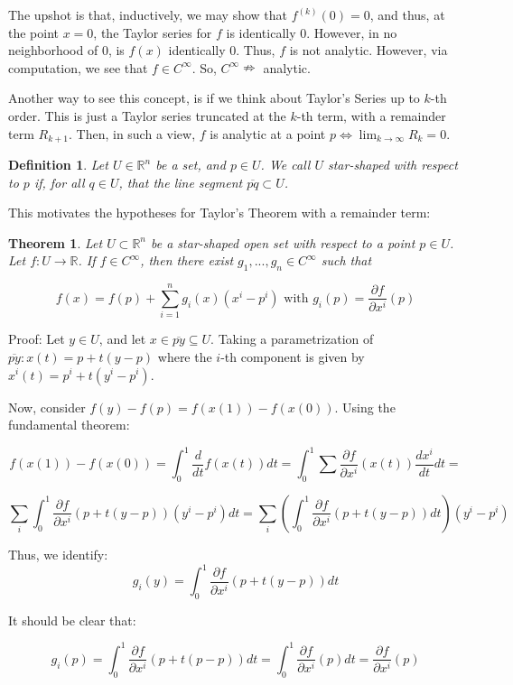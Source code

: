 \documentclass[10pt]{article}
\newtheorem{definition}{Definition}[section]
\newtheorem{theorem}{Theorem}[section]
\begin{document}
The upshot is that, inductively, we may show that $f^{(k)}(0) = 0$, and thus, at the point $x = 0$, the Taylor series for $f$ is identically 0. However, in no neighborhood of 0, is $f(x)$ identically 0. Thus, $f$ is not analytic. However, via computation, we see that $f \in C^{\infty}$. So, $C^\infty \nRightarrow$ analytic.

Another way to see this concept, is if we think about Taylor’s Series up to $k$-th order. This is just a Taylor series truncated at the $k$-th term, with a remainder term $R_{k+1}$. Then, in such a view, $f$ is analytic at a point $p \iff \lim_{k \to \infty} R_k = 0$.

\begin{definition}
Let $U \in \mathbb{R}^n$ be a set, and $p \in U$. We call $U$ star-shaped with respect to $p$ if, for all $q \in U$, that the line segment $\overline{pq} \subset U$.
\end{definition}

This motivates the hypotheses for Taylor’s Theorem with a remainder term:

\begin{theorem}
Let $U \subset \mathbb{R}^n$ be a star-shaped open set with respect to a point $p \in U$. Let $f: U \to \mathbb{R}$. If $f \in C^\infty$, then there exist $g_1,...,g_n \in C^\infty$ such that

$$ f(x) = f(p) + \sum_{i=1}^n g_i(x) (x^i - p^i) \text{ with } g_i(p) = \frac{\partial f}{\partial x^i}(p) $$
\end{theorem}

Proof: Let $y \in U$, and let $x \in \overline{py} \subseteq U$. Taking a parametrization of $\overline{py}: x(t) = p + t(y-p) $ where the $i$-th component is given by $x^i(t) = p^i + t(y^i - p^i)$.

Now, consider $f(y) - f(p) = f(x(1)) - f(x(0))$. Using the fundamental theorem:

$$ f(x(1)) - f(x(0)) = \int_0^1 \frac{d}{dt} f(x(t)) dt  = \int_0^1 \sum \frac{\partial f}{\partial x^i} (x(t)) \frac{dx^i}{dt} dt = $$

$$ \sum_i  \int_0^1 \frac{\partial f}{\partial x^i} (p + t(y-p)) (y^i - p^i) dt =   \sum_i  \left(\int_0^1 \frac{\partial f}{\partial x^i} (p + t(y-p))dt \right) (y^i - p^i) $$

Thus, we identify: $$g_i(y) = \int_0^1 \frac{\partial f}{\partial x^i} (p + t(y-p))dt$$

It should be clear that:

$$g_i(p) =  \int_0^1 \frac{\partial f}{\partial x^i} (p + t(p-p))dt = \int_0^1 \frac{\partial f}{\partial x^i}(p)dt =  \frac{\partial f}{\partial x^i}(p) $$
\end{document}
